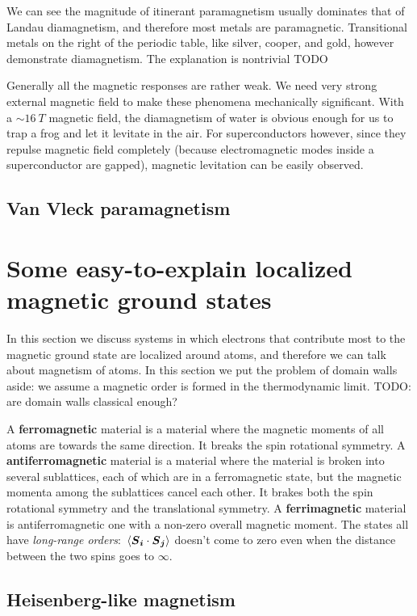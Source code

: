 \documentclass[hyperref, a4paper]{article}
\newcommand*{\concept}[1]{{\textbf{#1}}}
\begin{document}
We can see the magnitude of itinerant paramagnetism usually dominates that of Landau diamagnetism,
and therefore most metals are paramagnetic. 
Transitional metals on the right of the periodic table, like silver, cooper, and gold,
however demonstrate diamagnetism.
The explanation is nontrivial TODO

Generally all the magnetic responses are rather weak. 
We need very strong external magnetic field 
to make these phenomena mechanically significant.
With a $\sim \SI{16}{T}$ magnetic field,
the diamagnetism of water is obvious enough 
for us to trap a frog and let it levitate in the air.
For superconductors however, 
since they repulse magnetic field completely
(because electromagnetic modes inside a superconductor are gapped),
magnetic levitation can be easily observed.

\subsection{Van Vleck paramagnetism}

\section{Some easy-to-explain localized magnetic ground states}

In this section we discuss systems in which 
electrons that contribute most to the magnetic ground state 
are localized around atoms,
and therefore we can talk about magnetism of atoms.
In this section we put the problem of domain walls aside: 
we assume a magnetic order is formed in the thermodynamic limit. TODO: are domain walls classical enough?

A \concept{ferromagnetic} material is a material 
where the magnetic moments of all atoms are towards the same direction.
It breaks the spin rotational symmetry.
A \concept{antiferromagnetic} material is a material
where the material is broken into several sublattices,
each of which are in a ferromagnetic state,
but the magnetic momenta among the sublattices cancel each other.
It brakes both the spin rotational symmetry 
and the translational symmetry.
A \concept{ferrimagnetic} material is antiferromagnetic one with a non-zero overall magnetic moment.
The states all have \emph{long-range orders}:
$\expval*{\vb*{S}_{\vb*{i}} \cdot \vb*{S}_{\vb*{j}}}$ doesn't come to zero 
even when the distance between the two spins goes to $\infty$.

\subsection{Heisenberg-like magnetism}
\end{document}
